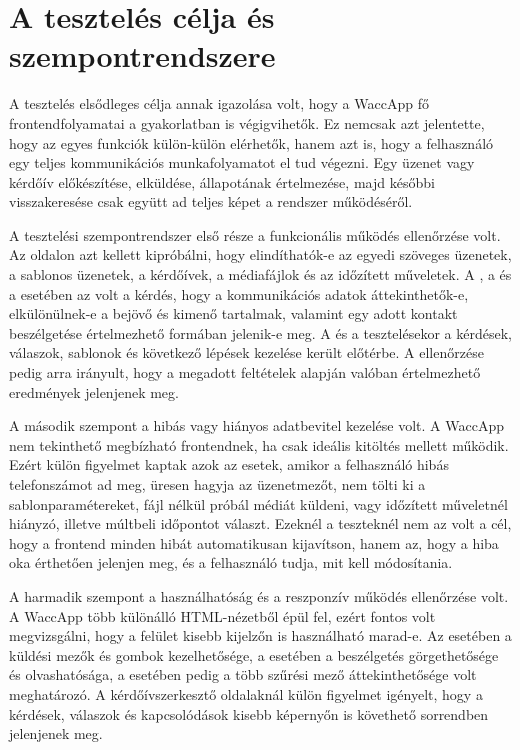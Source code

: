 \section{A tesztelés célja és szempontrendszere}

A tesztelés elsődleges célja annak igazolása volt, hogy a WaccApp fő frontendfolyamatai a gyakorlatban is végigvihetők. Ez nemcsak azt jelentette, hogy az egyes funkciók külön-külön elérhetők, hanem azt is, hogy a felhasználó egy teljes kommunikációs munkafolyamatot el tud végezni. Egy üzenet vagy kérdőív előkészítése, elküldése, állapotának értelmezése, majd későbbi visszakeresése csak együtt ad teljes képet a rendszer működéséről.

A tesztelési szempontrendszer első része a funkcionális működés ellenőrzése volt. Az  oldalon azt kellett kipróbálni, hogy elindíthatók-e az egyedi szöveges üzenetek, a sablonos üzenetek, a kérdőívek, a médiafájlok és az időzített műveletek. A , a  és a  esetében az volt a kérdés, hogy a kommunikációs adatok áttekinthetők-e, elkülönülnek-e a bejövő és kimenő tartalmak, valamint egy adott kontakt beszélgetése értelmezhető formában jelenik-e meg. A  és a  tesztelésekor a kérdések, válaszok, sablonok és következő lépések kezelése került előtérbe. A  ellenőrzése pedig arra irányult, hogy a megadott feltételek alapján valóban értelmezhető eredmények jelenjenek meg.

A második szempont a hibás vagy hiányos adatbevitel kezelése volt. A WaccApp nem tekinthető megbízható frontendnek, ha csak ideális kitöltés mellett működik. Ezért külön figyelmet kaptak azok az esetek, amikor a felhasználó hibás telefonszámot ad meg, üresen hagyja az üzenetmezőt, nem tölti ki a sablonparamétereket, fájl nélkül próbál médiát küldeni, vagy időzített műveletnél hiányzó, illetve múltbeli időpontot választ. Ezeknél a teszteknél nem az volt a cél, hogy a frontend minden hibát automatikusan kijavítson, hanem az, hogy a hiba oka érthetően jelenjen meg, és a felhasználó tudja, mit kell módosítania.

A harmadik szempont a használhatóság és a reszponzív működés ellenőrzése volt. A WaccApp több különálló HTML-nézetből épül fel, ezért fontos volt megvizsgálni, hogy a felület kisebb kijelzőn is használható marad-e. Az  esetében a küldési mezők és gombok kezelhetősége, a  esetében a beszélgetés görgethetősége és olvashatósága, a  esetében pedig a több szűrési mező áttekinthetősége volt meghatározó. A kérdőívszerkesztő oldalaknál külön figyelmet igényelt, hogy a kérdések, válaszok és kapcsolódások kisebb képernyőn is követhető sorrendben jelenjenek meg.

